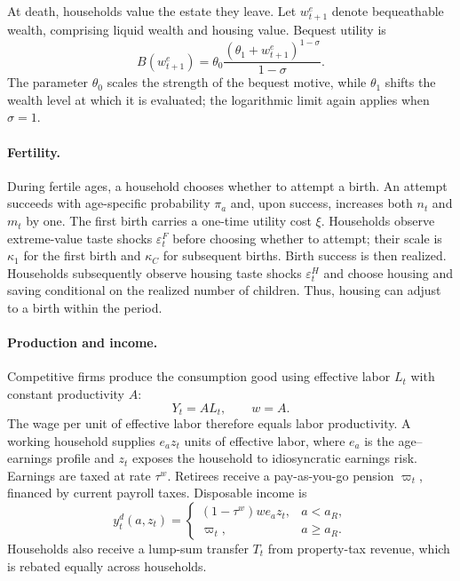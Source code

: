 At death, households value the estate they leave. Let $w^e_{t+1}$ denote
bequeathable wealth, comprising liquid wealth and housing value. Bequest
utility is
\begin{equation}
 B(w^e_{t+1})
 =\theta_0\frac{(\theta_1+w^e_{t+1})^{1-\sigma}}{1-\sigma}.
 \label{eq:env-bequest-utility}
\end{equation}
The parameter $\theta_0$ scales the strength of the bequest motive, while
$\theta_1$ shifts the wealth level at which it is evaluated; the logarithmic
limit again applies when $\sigma=1$.

\paragraph{Fertility.}
During fertile ages, a household chooses whether to attempt a birth. An
attempt succeeds with age-specific probability $\pi_a$ and, upon success,
increases both $n_t$ and $m_t$ by one. The first birth carries a one-time
utility cost $\xi$. Households observe extreme-value taste shocks
$\varepsilon_t^F$ before choosing whether to attempt; their scale is
$\kappa_1$ for the first birth and $\kappa_C$ for subsequent births.
Birth success is then realized. Households subsequently observe housing
taste shocks $\varepsilon_t^H$ and choose housing and saving conditional on
the realized number of children. Thus, housing can adjust to a birth within
the period.

\paragraph{Production and income.}
Competitive firms produce the consumption good using effective labor $L_t$
with constant productivity $A$:
\begin{equation}
 Y_t=A L_t,\qquad w=A.
 \label{eq:env-production}
\end{equation}
The wage per unit of effective labor therefore equals labor productivity.
A working household supplies $e_a z_t$ units of effective labor, where $e_a$
is the age--earnings profile and $z_t$ exposes the household to idiosyncratic
earnings risk. Earnings are taxed at rate $\tau^w$. Retirees receive a
pay-as-you-go pension $\varpi_t$, financed by current payroll taxes.
Disposable income is
\begin{equation}
 y_t^d(a,z_t)=
 \begin{cases}
 (1-\tau^w)w e_a z_t, & a<a_R,\\
 \varpi_t, & a\geq a_R.
 \end{cases}
 \label{eq:env-income}
\end{equation}
Households also receive a lump-sum transfer $T_t$ from property-tax revenue,
which is rebated equally across households.

